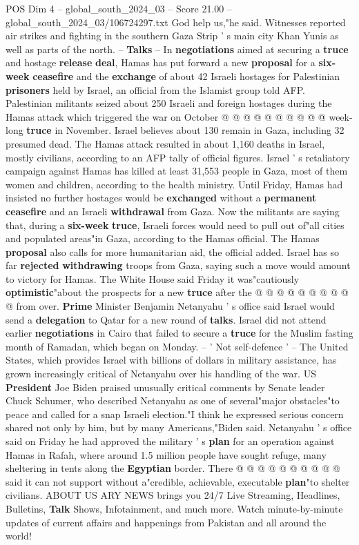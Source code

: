\begin{textsample}{POS Dim 4 – global\_south\_2024\_03 – Score 21.00 – global\_south\_2024\_03/106724297.txt}
God help us,"he said.
Witnesses reported air strikes and fighting in the southern Gaza Strip ' s main city Khan Yunis as well as parts of the north. -- \textbf{Talks} -- In \textbf{negotiations} aimed at securing a \textbf{truce} and hostage \textbf{release} \textbf{deal}, Hamas has put forward a new \textbf{proposal} for a \textbf{six-week} \textbf{ceasefire} and the \textbf{exchange} of about 42 Israeli hostages for Palestinian \textbf{prisoners} held by Israel, an official from the Islamist group told AFP.
Palestinian militants seized about 250 Israeli and foreign hostages during the Hamas attack which triggered the war on October @ @ @ @ @ @ @ @ @ @ week-long \textbf{truce} in November.
Israel believes about 130 remain in Gaza, including 32 presumed dead.
The Hamas attack resulted in about 1,160 deaths in Israel, mostly civilians, according to an AFP tally of official figures.
Israel ' s retaliatory campaign against Hamas has killed at least 31,553 people in Gaza, most of them women and children, according to the health ministry.
Until Friday, Hamas had insisted no further hostages would be \textbf{exchanged} without a \textbf{permanent} \textbf{ceasefire} and an Israeli \textbf{withdrawal} from Gaza.
Now the militants are saying that, during a \textbf{six-week} \textbf{truce}, Israeli forces would need to pull out of"all cities and populated areas"in Gaza, according to the Hamas official.
The Hamas \textbf{proposal} also calls for more humanitarian aid, the official added.
Israel has so far \textbf{rejected} \textbf{withdrawing} troops from Gaza, saying such a move would amount to victory for Hamas.
The White House said Friday it was"cautiously \textbf{optimistic}"about the prospects for a new \textbf{truce} after the @ @ @ @ @ @ @ @ @ @ from over. \textbf{Prime} Minister Benjamin Netanyahu ' s office said Israel would send a \textbf{delegation} to Qatar for a new round of \textbf{talks}.
Israel did not attend earlier \textbf{negotiations} in Cairo that failed to secure a \textbf{truce} for the Muslim fasting month of Ramadan, which began on Monday. -- ' Not self-defence ' -- The United States, which provides Israel with billions of dollars in military assistance, has grown increasingly critical of Netanyahu over his handling of the war.
US \textbf{President} Joe Biden praised unusually critical comments by Senate leader Chuck Schumer, who described Netanyahu as one of several"major obstacles"to peace and called for a snap Israeli election."I think he expressed serious concern shared not only by him, but by many Americans,"Biden said.
Netanyahu ' s office said on Friday he had approved the military ' s \textbf{plan} for an operation against Hamas in Rafah, where around 1.5 million people have sought refuge, many sheltering in tents along the \textbf{Egyptian} border.
There @ @ @ @ @ @ @ @ @ @ said it can not support without a"credible, achievable, executable \textbf{plan}"to shelter civilians.
ABOUT US ARY NEWS brings you 24/7 Live Streaming, Headlines, Bulletins, \textbf{Talk} Shows, Infotainment, and much more.
Watch minute-by-minute updates of current affairs and happenings from Pakistan and all around the world!


\end{textsample}
